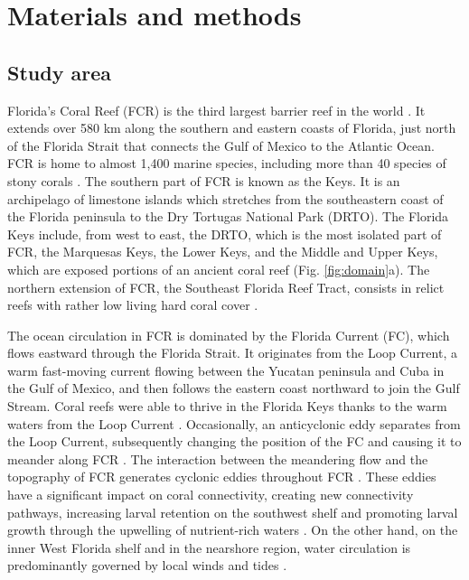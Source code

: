 \documentclass[fleqn,10pt]{wlscirep}
\begin{document}
\section{Materials and methods}
\subsection{Study area}
Florida's Coral Reef (FCR) is the third largest barrier reef in the world \citep{Finkl2008Jul}. It extends over 580 km along the southern and eastern coasts of Florida, just north of the Florida Strait that connects the Gulf of Mexico to the Atlantic Ocean. FCR is home to almost 1,400 marine species, including more than 40 species of stony corals \citep{Banks2008}. The southern part of FCR is known as the Keys. It is an archipelago of limestone islands which stretches from the southeastern coast of the Florida peninsula to the Dry Tortugas National Park (DRTO). The Florida Keys include, from west to east, the DRTO, which is the most isolated part of FCR, the Marquesas Keys, the Lower Keys, and the Middle and Upper Keys, which are exposed portions of an ancient coral reef (Fig. \ref{fig:domain}a). The northern extension of FCR, the Southeast Florida Reef Tract, consists in relict reefs with rather low living hard coral cover \citep{Hoffmeister1968Nov,Banks2008}.

The ocean circulation in FCR is dominated by the Florida Current (FC), which flows eastward through the Florida Strait. It originates from the Loop Current, a warm fast-moving current flowing between the Yucatan peninsula and Cuba in the Gulf of Mexico, and then follows the eastern coast northward to join the Gulf Stream. Coral reefs were able to thrive in the Florida Keys thanks to the warm waters from the Loop Current \citep{Donahue2008Jan}. Occasionally, an anticyclonic eddy separates from the Loop Current, subsequently changing the position of the FC and causing it to meander along FCR \citep{Leipper1970Jan,Vukovich1988Dec}. The interaction between the meandering flow and the topography of FCR generates cyclonic eddies throughout FCR \citep{Kourafalou2012May}. These eddies have a significant impact on coral connectivity, creating new connectivity pathways, increasing larval retention on the southwest shelf and promoting larval growth through the upwelling of nutrient-rich waters \citep{Limouzy-Paris1997Jul,Lee1994May, Burgess2007Jul}. On the other hand, on the inner West Florida shelf and  in the nearshore region, water circulation is predominantly governed by local winds and tides \citep{Lee2002Jun,Sponaugle2007Feb}.
\end{document}
